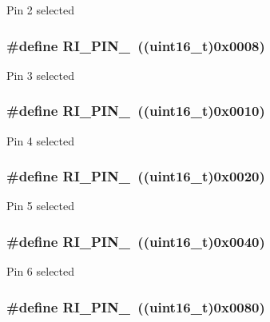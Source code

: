 Pin 2 selected \hypertarget{group___r_i___pin_ga4c79fe9dcee5bda36f7067ed22ba77a4}{
\subsubsection[{R\-I\-\_\-\-P\-I\-N\-\_\-3}]{\setlength{\rightskip}{0pt plus 5cm}\#define R\-I\-\_\-\-P\-I\-N\-\_~((uint16\-\_\-t)0x0008)}}\label{group___r_i___pin_ga4c79fe9dcee5bda36f7067ed22ba77a4}
Pin 3 selected \hypertarget{group___r_i___pin_ga7f443ade586a8aa3be0da85eee9e7fb9}{
\subsubsection[{R\-I\-\_\-\-P\-I\-N\-\_\-4}]{\setlength{\rightskip}{0pt plus 5cm}\#define R\-I\-\_\-\-P\-I\-N\-\_~((uint16\-\_\-t)0x0010)}}\label{group___r_i___pin_ga7f443ade586a8aa3be0da85eee9e7fb9}
Pin 4 selected \hypertarget{group___r_i___pin_ga0db731223773e6d28b38134e64c40076}{
\subsubsection[{R\-I\-\_\-\-P\-I\-N\-\_\-5}]{\setlength{\rightskip}{0pt plus 5cm}\#define R\-I\-\_\-\-P\-I\-N\-\_~((uint16\-\_\-t)0x0020)}}\label{group___r_i___pin_ga0db731223773e6d28b38134e64c40076}
Pin 5 selected \hypertarget{group___r_i___pin_gafdb2d5d7e07e02f945d51d509bb54cce}{
\subsubsection[{R\-I\-\_\-\-P\-I\-N\-\_\-6}]{\setlength{\rightskip}{0pt plus 5cm}\#define R\-I\-\_\-\-P\-I\-N\-\_~((uint16\-\_\-t)0x0040)}}\label{group___r_i___pin_gafdb2d5d7e07e02f945d51d509bb54cce}
Pin 6 selected \hypertarget{group___r_i___pin_ga6dfdbc6035e977af6d9191805a51f8c8}{
\subsubsection[{R\-I\-\_\-\-P\-I\-N\-\_\-7}]{\setlength{\rightskip}{0pt plus 5cm}\#define R\-I\-\_\-\-P\-I\-N\-\_~((uint16\-\_\-t)0x0080)}}\label{group___r_i___pin_ga6dfdbc6035e977af6d9191805a51f8c8}
